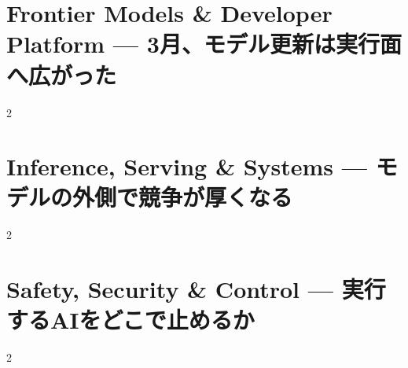 \documentclass[lualatex,a4paper,11pt]{jlreq}
\begin{document}
\surveycover
\clearpage


\clearpage
\section{Frontier Models \& Developer Platform — 3月、モデル更新は実行面へ広がった}
\label{pkg:frontier-models-platform-march}
\vspace{0.15em}

\vspace{0.2em}
\begin{multicols}{2}

\end{multicols}

\medskip


\Needspace{0.45\textheight}
\bigskip
\section{Inference, Serving \& Systems — モデルの外側で競争が厚くなる}
\label{pkg:inference-serving-systems-march}
\vspace{0.15em}

\vspace{0.2em}
\begin{multicols}{2}

\end{multicols}

\medskip


\Needspace{0.45\textheight}
\bigskip
\section{Safety, Security \& Control — 実行するAIをどこで止めるか}
\label{pkg:safety-security-control-march}
\vspace{0.15em}

\vspace{0.2em}
\begin{multicols}{2}

\end{multicols}

\medskip

\end{document}
